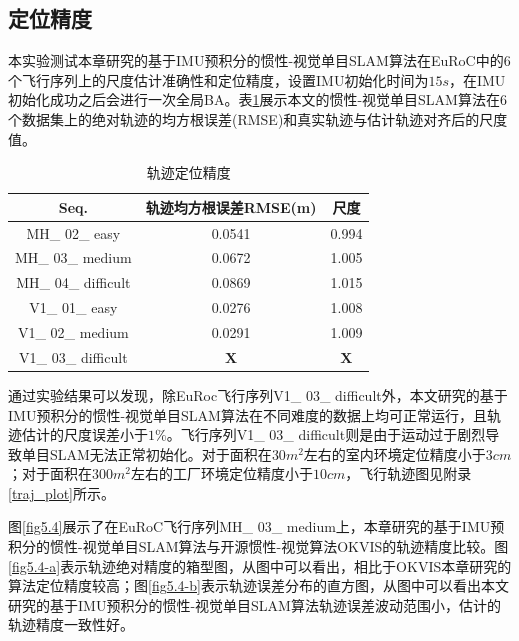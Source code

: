 \subsection{定位精度}
本实验测试本章研究的基于IMU预积分的惯性-视觉单目SLAM算法在EuRoC中的6个飞行序列上的尺度估计准确性和定位精度，设置IMU初始化时间为$15s$，在IMU初始化成功之后会进行一次全局BA。表\ref{tab5.1}展示本文的惯性-视觉单目SLAM算法在6个数据集上的绝对轨迹的均方根误差(RMSE)和真实轨迹与估计轨迹对齐后的尺度值。

\begin{table}[h]	%
\renewcommand\arraystretch{1}		%
\centering
\caption{轨迹定位精度}   %
\label{tab5.1}
	\begin{tabular*}{0.9\textwidth}{@{\extracolsep{\fill}}ccc}  %
	\toprule
	Seq. &轨迹均方根误差RMSE(m) &尺度 \\
	\midrule
	MH\_ 02\_ easy 			&0.0541				&0.994				\\
	MH\_ 03\_ medium		&0.0672 			&1.005 				\\
	MH\_ 04\_ difficult		&0.0869				&1.015				\\
	V1\_ 01\_ easy 			&0.0276				&1.008 				\\
	V1\_ 02\_ medium		&0.0291				&1.009 				\\
	V1\_ 03\_ difficult		&$\boldsymbol{X}$	&$\boldsymbol{X}$	\\			
	\bottomrule
	\end{tabular*}
\end{table}

通过实验结果可以发现，除EuRoc飞行序列V1\_ 03\_ difficult外，本文研究的基于IMU预积分的惯性-视觉单目SLAM算法在不同难度的数据上均可正常运行，且轨迹估计的尺度误差小于$1\%$。飞行序列V1\_ 03\_ difficult则是由于运动过于剧烈导致单目SLAM无法正常初始化。对于面积在$30 m^2$左右的室内环境定位精度小于$3cm$；对于面积在$300m^2$左右的工厂环境定位精度小于$10cm$，飞行轨迹图见附录\ref{traj_plot}所示。

图\ref{fig5.4}展示了在EuRoC飞行序列MH\_ 03\_ medium上，本章研究的基于IMU预积分的惯性-视觉单目SLAM算法与开源惯性-视觉算法OKVIS的轨迹精度比较。图\ref{fig5.4-a}表示轨迹绝对精度的箱型图，从图中可以看出，相比于OKVIS本章研究的算法定位精度较高；图\ref{fig5.4-b}表示轨迹误差分布的直方图，从图中可以看出本文研究的基于IMU预积分的惯性-视觉单目SLAM算法轨迹误差波动范围小，估计的轨迹精度一致性好。

